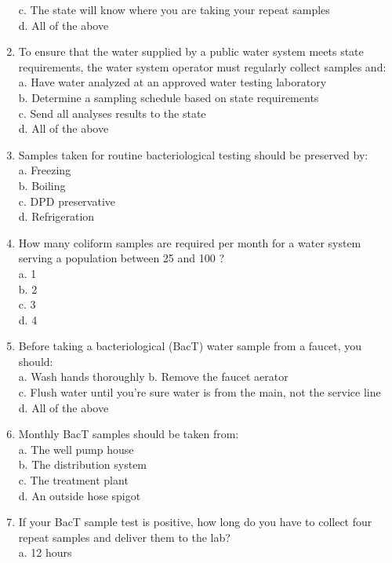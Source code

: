 \begin{enumerate}[1.]
c. The state will know where you are taking your repeat samples\\
d. All of the above\\
\item To ensure that the water supplied by a public water system meets state requirements, the water system operator must regularly collect samples and:\\
a. Have water analyzed at an approved water testing laboratory\\
b. Determine a sampling schedule based on state requirements\\
c. Send all analyses results to the state\\
d. All of the above\\
\item Samples taken for routine bacteriological testing should be preserved by:\\
a. Freezing\\
b. Boiling\\
c. DPD preservative\\
d. Refrigeration\\
\item How many coliform samples are required per month for a water system serving a population between 25 and 100 ?\\
a. 1\\
b. 2\\
c. 3\\
d. 4\\
\item Before taking a bacteriological (BacT) water sample from a faucet, you should:\\
a. Wash hands thoroughly b. Remove the faucet aerator\\
c. Flush water until you're sure water is from the main, not the service line\\
d. All of the above\\
\item Monthly BacT samples should be taken from:\\
a. The well pump house\\
b. The distribution system\\
c. The treatment plant\\
d. An outside hose spigot\\
\item If your BacT sample test is positive, how long do you have to collect four repeat samples and deliver them to the lab?\\
a. 12 hours\\

\end{enumerate}

